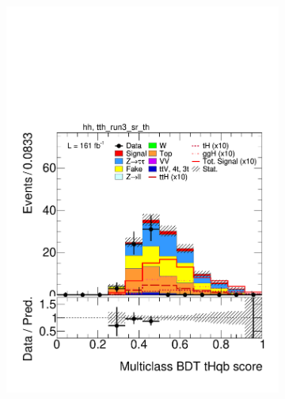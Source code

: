 \begin{figure}[htbp]
  \centering
  \begin{subfigure}[b]{0.49\textwidth}
    \centering
    \includegraphics[width=\textwidth]{images/plots_modelling_run2_run3_variables/run_3_tth/plot_tth_th_multiclass_th_hh_tth_run3_sr_th_22_23_24.pdf}
    \caption{}
    \label{fig:overtrain_signal}
  \end{subfigure}
  \hfill
  \begin{subfigure}[b]{0.49\textwidth}
    \centering

\end{subfigure}
\end{figure}
